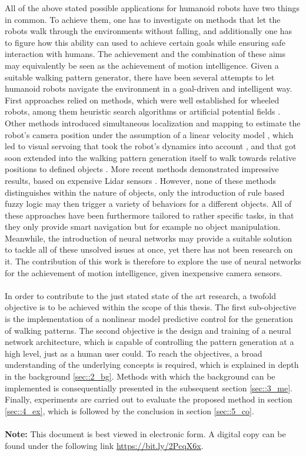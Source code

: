 All of the above stated possible applications for humanoid robots have two things in common. To achieve them, one has to investigate on methods that let the robots walk through the environments without falling, and additionally one has to figure how this ability can used to achieve certain goals while ensuring safe interaction with humans. The achievement and the combination of these aims may equivalently be seen as the achievement of motion intelligence. Given a suitable walking pattern generator, there have been several attempts to let humanoid robots navigate the environment in a goal-driven and intelligent way. First approaches relied on methods, which were well established for wheeled robots, among them heuristic search algorithms or artificial potential fields \cite{kuffner2005motion}. Other methods introduced simultaneous localization and mapping to estimate the robot's camera position under the assumption of a linear velocity model \cite{stasse2008integrating}, which led to visual servoing that took the robot's dynamics into account \cite{dune2010cancelling}, and that got soon extended into the walking pattern generation itself to walk towards relative positions to defined objects \cite{dune2011vision}. More recent methods demonstrated impressive results, based on expensive Lidar sensors \cite{griffin2019footstep}. However, none of these methods distinguishes within the nature of objects, only the introduction of rule based fuzzy logic \cite{dadios2012humanoid} may then trigger a variety of behaviors for a different objects. All of these approaches have been furthermore tailored to rather specific tasks, in that they only provide smart navigation but for example no object manipulation. Meanwhile, the introduction of neural networks may provide a suitable solution to tackle all of these unsolved issues at once, yet there has not been research on it. The contribution of this work is therefore to explore the use of neural networks for the achievement of motion intelligence, given inexpensive camera sensors.
\\\\
In order to contribute to the just stated state of the art research, a twofold objective is to be achieved within the scope of this thesis. The first sub-objective is the implementation of a nonlinear model predictive control for the generation of walking patterns. The second objective is the design and training of a neural network architecture, which is capable of controlling the pattern generation at a high level, just as a human user could. To reach the objectives, a broad understanding of the underlying concepts is required, which is explained in depth in the background \ref{sec::2_bg}. Methods with which the background can be implemented is consequentially presented in the subsequent section \ref{sec::3_me}. Finally, experiments are carried out to evaluate the proposed method in section \ref{sec::4_ex}, which is followed by the conclusion in section \ref{sec::5_co}.
\\\\
\textbf{Note:} This document is best viewed in electronic form. A digital copy can be found under the following link \href{https://bit.ly/2PcqX6x}{\underline{https://bit.ly/2PcqX6x}}.
